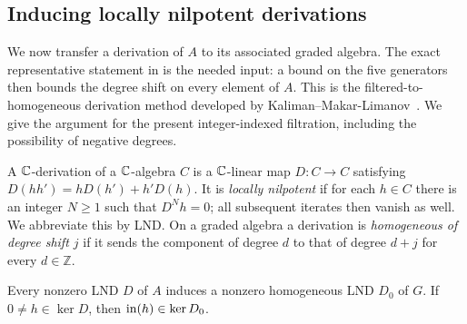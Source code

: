 \subsection{Inducing locally nilpotent derivations}

We now transfer a derivation of $A$ to its associated graded algebra.
The exact representative statement in  is the needed
input: a bound on the five generators then bounds the degree shift on
every element of $A$.
This is the filtered-to-homogeneous derivation method developed by
Kaliman--Makar-Limanov~\cite[Sections~3--5]{KalimanMakarLimanov}.
We give the argument for the present integer-indexed filtration,
including the possibility of negative degrees.

A $\mathbb C$-derivation of a $\mathbb C$-algebra $C$ is a $\mathbb C$-linear map
$D:C\to C$ satisfying $D(hh')=hD(h')+h'D(h)$.
It is \emph{locally nilpotent} if for each $h\in C$ there is an
integer $N\geq 1$ such that $D^Nh=0$; all subsequent iterates then
vanish as well.  We abbreviate this by LND.
On a graded algebra a derivation is \emph{homogeneous of degree
shift $j$} if it sends the component of degree $d$ to that of degree
$d+j$ for every $d\in\mathbb Z$.

\begin{lemma}\label{lem:induced-lnd}
Every nonzero LND $D$ of $A$ induces a nonzero homogeneous LND
$D_0$ of $G$.  If $0\ne h\in\ker D$, then
$\operatorname{in}(h)\in\ker D_0$.
\end{lemma}

